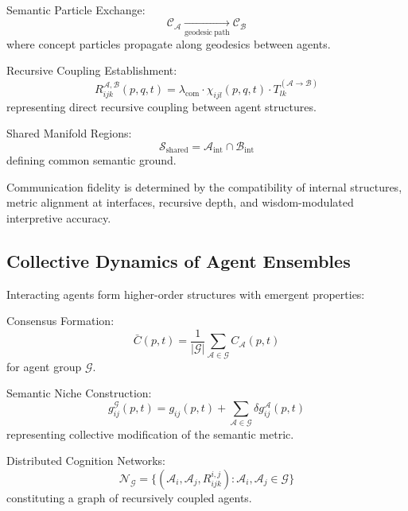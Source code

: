 Semantic Particle Exchange:
\begin{equation}
\mathcal{C}_{\mathcal{A}} \xrightarrow[\mathrm{geodesic\ path}]{} \mathcal{C}_{\mathcal{B}}
\end{equation}
where concept particles propagate along geodesics between agents.

Recursive Coupling Establishment:
\begin{equation}
R_{ijk}^{\mathcal{A},\mathcal{B}}(p, q, t) = \lambda_{\mathrm{com}} \cdot \chi_{ijl}(p, q, t) \cdot T_{lk}^{(\mathcal{A} \to \mathcal{B})}
\end{equation}
representing direct recursive coupling between agent structures.

Shared Manifold Regions:
\begin{equation}
\mathcal{S}_{\mathrm{shared}} = \mathcal{A}_{\mathrm{int}} \cap \mathcal{B}_{\mathrm{int}}
\end{equation}
defining common semantic ground.

Communication fidelity is determined by the compatibility of internal structures, metric alignment at interfaces, recursive depth, and wisdom-modulated interpretive accuracy.

\subsection{Collective Dynamics of Agent Ensembles}

Interacting agents form higher-order structures with emergent properties:

Consensus Formation:
\begin{equation}
\bar{C}(p,t) = \frac{1}{|\mathcal{G}|} \sum_{\mathcal{A} \in \mathcal{G}} C_{\mathcal{A}}(p,t)
\end{equation}
for agent group \(\mathcal{G}\).

Semantic Niche Construction:
\begin{equation}
g_{ij}^{\mathcal{G}}(p,t) = g_{ij}(p,t) + \sum_{\mathcal{A} \in \mathcal{G}} \delta g_{ij}^{\mathcal{A}}(p,t)
\end{equation}
representing collective modification of the semantic metric.

Distributed Cognition Networks:
\begin{equation}
\mathcal{N}_{\mathcal{G}} = \{(\mathcal{A}_i, \mathcal{A}_j, R_{ijk}^{i,j}) : \mathcal{A}_i, \mathcal{A}_j \in \mathcal{G}\}
\end{equation}
constituting a graph of recursively coupled agents.

